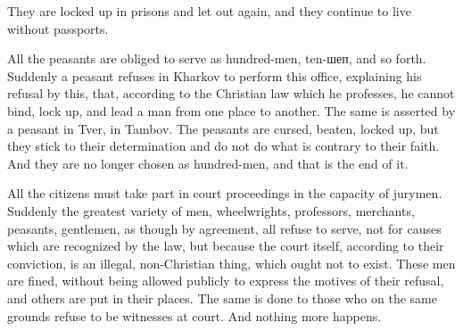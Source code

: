 \documentclass{book}
\begin{document}
They are locked up in prisons and let out again, and they continue to live without passports.

All the peasants are obliged to serve as hundred-men, ten-шеп, and so forth. Suddenly a peasant refuses in Kharkov to perform this office, explaining his refusal by this, that, according to the Christian law which he professes, he cannot bind, lock up, and lead a man from one place to another. The same is asserted by a peasant in Tver, in Tambov. The peasants are cursed, beaten, locked up, but they stick to their determination and do not do what is contrary to their faith. And they are no longer chosen as hundred-men, and that is the end of it.

All the citizens must take part in court proceedings in the capacity of jurymen. Suddenly the greatest variety of men, wheelwrights, professors, merchants, peasants, gentlemen, as though by agreement, all refuse to serve, not for causes which are recognized by the law, but because the court itself, according to their conviction, is an illegal, non-Christian thing, which ought not to exist. These men are fined, without being allowed publicly to express the motives of their refusal, and others are put in their places. The same is done to those who on the same grounds refuse to be witnesses at court. And nothing more happens.
\end{document}
